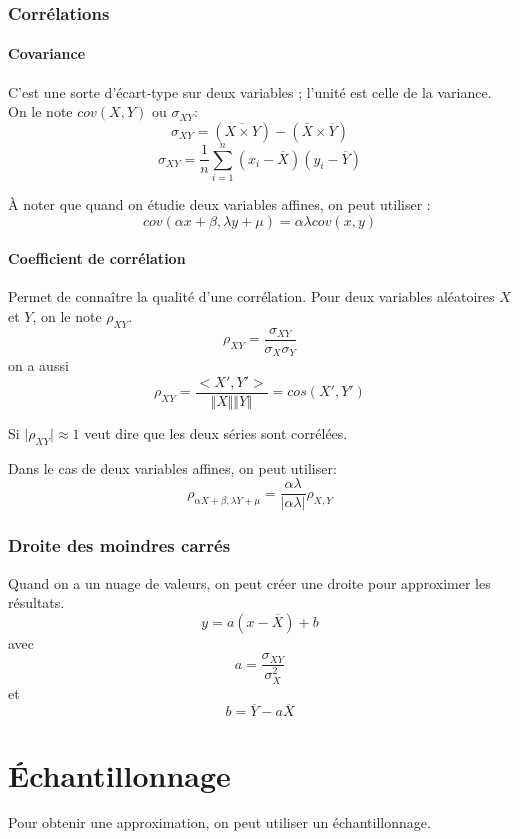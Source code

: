 \documentclass[10pt,a4paper,french]{article}
\begin{document}
\subsubsection{Corrélations}

\paragraph{Covariance}
C'est une sorte d'écart-type sur deux variables ; l'unité est celle de la variance. On le note $cov(X, Y)$ ou $\sigma_{XY}$:
\[ \sigma_{X Y} = (\overline{X \times Y}) - (\overline{X} \times \overline{Y}) \]
\[ \sigma_{X Y} = \frac{1}{n} \sum_{i=1}^n (x_i - \overline{X}) (y_i - \overline{Y}) \]

À noter que quand on étudie deux variables affines, on peut utiliser : \[ cov(\alpha x + \beta, \lambda y + \mu) = \alpha \lambda cov(x, y) \]

\paragraph{Coefficient de corrélation}
Permet de connaître la qualité d'une corrélation. Pour deux variables aléatoires $X$ et $Y$, on le note $\rho_{X Y}$.
\[ \rho_{X Y} = \frac{\sigma_{X Y}}{\sigma_X \sigma_Y} \]
on a aussi \[ \rho_{X Y} = \frac{<X', Y'>}{\Vert X \Vert \Vert Y \Vert} = cos(X', Y') \]

Si $\vert \rho_{X Y} \vert \approx 1$ veut dire que les deux séries sont corrélées.

Dans le cas de deux variables affines, on peut utiliser: \[ \rho_{\alpha X + \beta, \lambda Y + \mu} = \frac{\alpha \lambda}{\vert \alpha \lambda \vert} \rho_{X,Y} \]

\subsubsection{Droite des moindres carrés}

Quand on a un nuage de valeurs, on peut créer une droite pour approximer les résultats.
\[ y = a (x - \overline{X}) + b \]
avec \[ a = \frac{\sigma_{X Y}}{\sigma_X^2} \]
et \[ b = \overline{Y} - a \overline{X} \]

\section{Échantillonnage}

Pour obtenir une approximation, on peut utiliser un échantillonnage.
\end{document}
